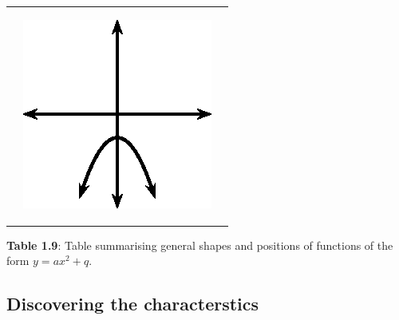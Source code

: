 \begin{center}
\begin{xtabular*}{\mytablewidth}[t]{|p{10\mystarwidth}|p{10\mystarwidth}|p{10\mystarwidth}|}
\begin{center}
      \vspace{2pt}
    \vspace{.1in}
    \end{center}    
                 &
    \setcounter{subfigure}{0}
\label{m39345*id242029}
    \begin{center}
    \label{m39345*id242029!!!underscore!!!media}\label{m39345*id242029!!!underscore!!!printimage}\includegraphics[width=.3\columnwidth]{col11306.imgs/m39345_MG10C11_018.png} %
      \vspace{2pt}
    \vspace{.1in}
    \end{center}    
     \tabularnewline{}
    \end{xtabular*}
      \end{center}
    \begin{center}{\small\bfseries Table 1.9}: Table summarising general shapes and positions of functions of the form $y=a{x}^{2}+q$.\end{center}
    \par
  \subsection{Discovering the characterstics}
        \label{m39345*uid117}
